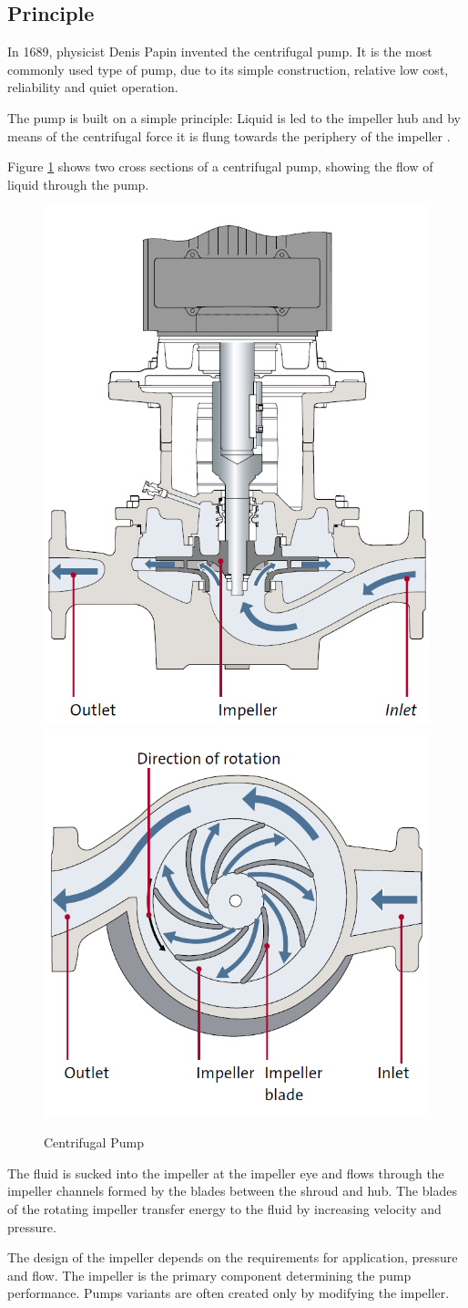 \subsection{Principle}
In 1689, physicist Denis Papin invented the centrifugal pump. 
It is the most commonly used type of pump, due to its simple construction,
relative low cost, reliability and quiet operation.

The pump is built on a simple principle:
Liquid is led to the impeller hub
and by means of the centrifugal force it is flung towards the periphery of 
the impeller \cite{PumpHandbook}.

Figure \ref{fig:pump_sections} shows two cross sections of a centrifugal pump,
showing the flow of liquid through the pump.
\begin{figure}[h]
    \centering
    \includegraphics[width=0.3\linewidth]{figures/pump_cross_section.PNG}
    \qquad
    \hspace{0.1\textwidth}
    \includegraphics[width=0.3\linewidth]{figures/pump_above_view.PNG}
    \caption{Centrifugal Pump \cite{PumpHandbook}}
    \label{fig:pump_sections}
\end{figure}
\newpage

The fluid is sucked into the impeller at the impeller eye and flows through
the impeller channels formed by the blades between the shroud and hub.
The blades of the rotating impeller transfer energy to the fluid by
increasing velocity and pressure. \cite{CentrifugalPump}

The design of the impeller depends on the requirements for application,
pressure and flow. The impeller is the primary component determining the pump performance. 
Pumps variants are often created only by modifying the impeller.

